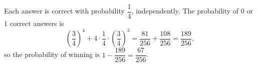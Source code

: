 Each answer is correct with probability $\dfrac14$, independently. The probability of $0$ or $1$ correct answers is
\[\left(\dfrac34\right)^4+4\cdot\dfrac14\cdot\left(\dfrac34\right)^3=\dfrac{81}{256}+\dfrac{108}{256}=\dfrac{189}{256},\]
so the probability of winning is $1-\dfrac{189}{256}=\boxed{\dfrac{67}{256}}$.
